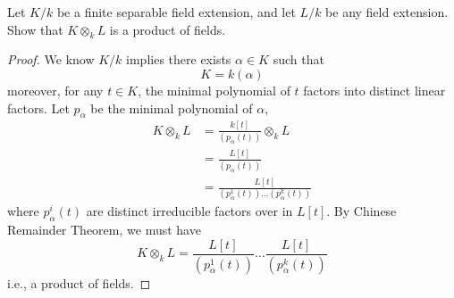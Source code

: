 \documentclass[openany]{book}
\begin{document}
\begin{prob}
    Let \(K/k\) be a finite separable field extension, and let \(L/k\) be any field extension. Show that \(K\otimes_{k}L\) is a product of fields.
\end{prob}
\begin{proof}
    We know $K/k$ implies there exists $\alpha\in K$ such that 
    \begin{equation*}
        K=k(\alpha)
    \end{equation*}
    moreover, for any $t\in K$, the minimal polynomial of $t$ factors into distinct linear factors. Let $p_\alpha$ be the minimal polynomial of $\alpha$, 
    \begin{align*}
        K\otimes_kL&=\frac{k[t]}{(p_\alpha(t))}\otimes_kL\\
        &=\frac{L[t]}{(p_\alpha(t))}\\
        &=\frac{L[t]}{(p_\alpha^1(t))\dots(p_\alpha^k(t))}
    \end{align*}
    where $p_\alpha^i(t)$ are distinct irreducible factors over in $L[t]$. By Chinese Remainder Theorem, we must have 
    \begin{equation*}
        K\otimes_kL=\frac{L[t]}{(p_\alpha^1(t))}\dots\frac{L[t]}{(p_\alpha^k(t))}
    \end{equation*}
    i.e., a product of fields.
\end{proof}
\end{document}
